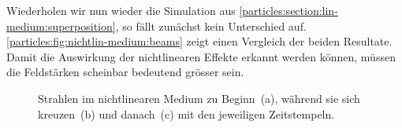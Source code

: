 Wiederholen wir nun wieder die Simulation aus \autoref{particles:section:lin-medium:superposition}, so fällt zunächst kein Unterschied auf.
\autoref{particles:fig:nichtlin-medium:beams} zeigt einen Vergleich der beiden Resultate.
Damit die Auswirkung der nichtlinearen Effekte erkannt werden können, müssen die Feldstärken scheinbar bedeutend grösser sein.
\begin{figure}
    \centering
    \label{particles:fig:nichtlin-medium:beams-1}\hfill
    \label{particles:fig:nichtlin-medium:beams-2}\hfill
    \label{particles:fig:nichtlin-medium:beams-3}
    \caption{Strahlen im nichtlinearen Medium zu Beginn~(a), während sie sich kreuzen~(b) und danach~(c) mit den jeweiligen Zeitstempeln.}\label{particles:fig:nichtlin-medium:beams}
\end{figure}


